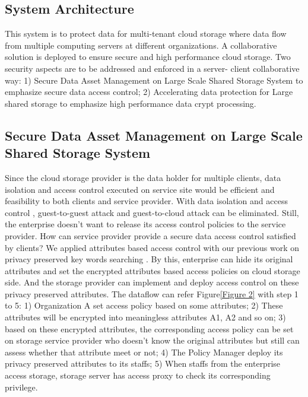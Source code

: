 \documentclass[10pt]{report}
\begin{document}
			\subsection{System Architecture}
				This system is to protect data for multi-tenant cloud storage where data flow from multiple computing servers at different organizations. A collaborative solution is deployed to ensure secure and high performance cloud storage. Two security aspects are to be addressed and enforced in a server- client collaborative way: 1) Secure Data Asset Management on Large Scale Shared Storage System to emphasize secure data access control; 2) Accelerating data protection for Large shared storage to emphasize high performance data crypt processing.				
			\subsection{Secure Data Asset Management on Large Scale Shared Storage System}
				Since the cloud storage provider is the data holder for multiple clients, data isolation and access control executed on service site would be efficient and feasibility to both clients and service provider. With data isolation and access control \cite{7,8}, guest-to-guest attack and guest-to-cloud attack can be eliminated. Still, the enterprise doesn't want to release its access control policies to the service provider. How can service provider provide a secure data access control satisfied by clients? We applied attributes based access control with our previous work on privacy preserved key words searching \cite{1}. By this, enterprise can hide its original attributes and set the encrypted attributes based access policies on cloud storage side. And the storage provider can implement and deploy access control on these privacy preserved attributes. The dataflow can refer Figure\ref{Figure 2} with step 1 to 5: 1) Organization A set access policy based on some attributes; 2) These attributes will be encrypted into meaningless attributes A1, A2 and so on; 3) based on these encrypted attributes, the corresponding access policy can be set on storage service provider who doesn't know the original attributes but still can assess whether that attribute meet or not; 4) The Policy Manager deploy its privacy preserved attributes to its staffs; 5) When staffs from the enterprise access storage, storage server has access proxy to check its corresponding privilege.
\end{document}
